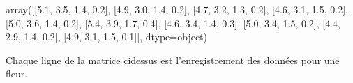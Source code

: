\documentclass[letterpaper,10pt,english]{jupyterBook}
\begin{document}
\begin{sphinxVerbatimOutput}

\begin{sphinxVerbatim}[commandchars=\\\{\}]
array([[5.1, 3.5, 1.4, 0.2],
       [4.9, 3.0, 1.4, 0.2],
       [4.7, 3.2, 1.3, 0.2],
       [4.6, 3.1, 1.5, 0.2],
       [5.0, 3.6, 1.4, 0.2],
       [5.4, 3.9, 1.7, 0.4],
       [4.6, 3.4, 1.4, 0.3],
       [5.0, 3.4, 1.5, 0.2],
       [4.4, 2.9, 1.4, 0.2],
       [4.9, 3.1, 1.5, 0.1]], dtype=object)
\end{sphinxVerbatim}
\end{sphinxVerbatimOutput}

\sphinxAtStartPar
Chaque ligne de la matrice ci\sphinxhyphen{}dessus est l’enregistrement des données pour une fleur.
\begin{sphinxVerbatimInput}

\begin{sphinxVerbatim}[commandchars=\\\{\}]
 
\end{sphinxVerbatim}
\end{sphinxVerbatimInput}
\end{document}
